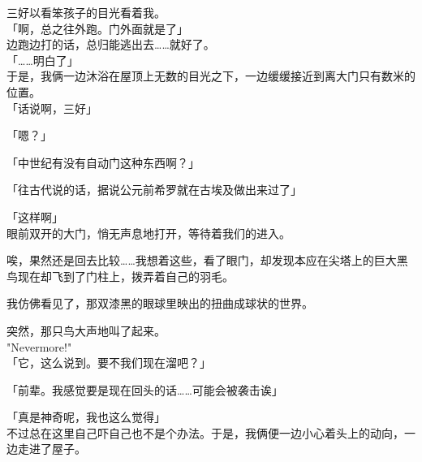 三好以看笨孩子的目光看着我。\\

「啊，总之往外跑。门外面就是了」\\

边跑边打的话，总归能逃出去……就好了。\\

「……明白了」\\

于是，我俩一边沐浴在屋顶上无数的目光之下，一边缓缓接近到离大门只有数米的位置。\\

「话说啊，三好」

「嗯？」

「中世纪有没有自动门这种东西啊？」

「往古代说的话，据说公元前希罗就在古埃及做出来过了」

「这样啊」\\

眼前双开的大门，悄无声息地打开，等待着我们的进入。

唉，果然还是回去比较……我想着这些，看了眼门，却发现本应在尖塔上的巨大黑鸟现在却飞到了门柱上，拨弄着自己的羽毛。

我仿佛看见了，那双漆黑的眼球里映出的扭曲成球状的世界。

突然，那只鸟大声地叫了起来。\\

"Nevermore!"\\

「它，这么说到。要不我们现在溜吧？」

「前辈。我感觉要是现在回头的话……可能会被袭击诶」

「真是神奇呢，我也这么觉得」\\

不过总在这里自己吓自己也不是个办法。于是，我俩便一边小心着头上的动向，一边走进了屋子。\\
